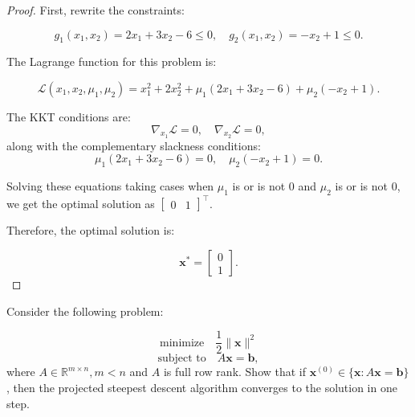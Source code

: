 \documentclass{article}
\begin{document}
\begin{proof}        
    First, rewrite the constraints:

    \[
    g_1(x_1, x_2) = 2x_1 + 3x_2 - 6 \leq 0, \quad g_2(x_1, x_2) = -x_2 + 1 \leq 0.
    \]

    The Lagrange function for this problem is:

    \[
    \mathcal{L}(x_1, x_2, \mu_1, \mu_2) = x_1^2 + 2x_2^2 + \mu_1 (2x_1 + 3x_2 - 6) + \mu_2 (-x_2 + 1).
    \]

    The KKT conditions are:
    \[
    \nabla_{x_1} \mathcal{L} = 0, \quad \nabla_{x_2} \mathcal{L} = 0,
    \]
    along with the complementary slackness conditions:
    \[
    \mu_1 (2x_1 + 3x_2 - 6) = 0, \quad \mu_2 (-x_2 + 1) = 0.
    \]

    Solving these equations taking cases when $\mu_1$ is or is not $0$ and $\mu_2$ is or is not $0$, we get the optimal solution as $\begin{bmatrix} 0 & 1 \end{bmatrix}^\top$.

    Therefore, the optimal solution is:

    \[
    \mathbf{x}^* = \begin{bmatrix} 0 \\ 1 \end{bmatrix}.
    \]
\end{proof}

\begin{question*}[8]
    Consider the following problem:

    \[
    \text{minimize} \quad \frac{1}{2} \|\mathbf{x}\|^2
    \]
    \[
     \text{subject to} \quad A \mathbf{x} = \mathbf{b},
    \]
    where \( A \in \mathbb{R}^{m \times n}, m < n \) and \( A \) is full row rank. Show that if \( \mathbf{x}^{(0)} \in \{ \mathbf{x} : A \mathbf{x} = \mathbf{b} \} \), then the projected steepest descent algorithm converges to the solution in one step.
\end{question*}
\end{document}
